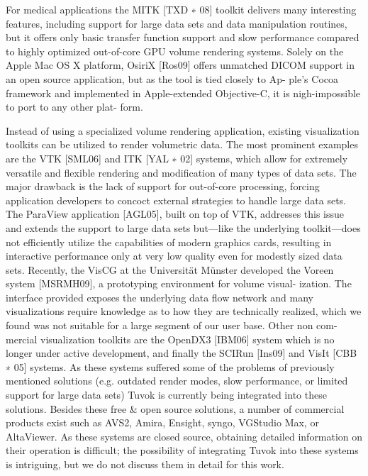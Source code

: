 For medical applications the MITK [TXD ∗ 08] toolkit 
delivers many interesting features, including support for large
data sets and data manipulation routines, but it offers only
basic transfer function support and slow performance compared
to highly optimized out-of-core GPU volume rendering
systems. Solely on the Apple Mac OS X platform,
OsiriX [Ros09] offers unmatched DICOM support in an
open source application, but as the tool is tied closely to Ap-
ple's Cocoa framework and implemented in Apple-extended
Objective-C, it is nigh-impossible to port to any other plat-
form.

Instead of using a specialized volume rendering application,
existing visualization toolkits can be utilized to render
volumetric data. The most prominent examples are the
VTK [SML06] and ITK [YAL ∗ 02] systems, which allow
for extremely versatile and flexible rendering and modification
of many types of data sets. The major drawback is
the lack of support for out-of-core processing, forcing
application developers to concoct external strategies to handle
large data sets. The ParaView application [AGL05], built on
top of VTK, addresses this issue and extends the support to
large data sets but---like the underlying toolkit---does not
efficiently utilize the capabilities of modern graphics cards,
resulting in interactive performance only at very low quality
even for modestly sized data sets. Recently, the VisCG
at the Universit\"at M\"unster developed the Voreen system
[MSRMH09], a prototyping environment for volume visual-
ization. The interface provided exposes the underlying data
flow network and many visualizations require knowledge as
to how they are technically realized, which we found was not
suitable for a large segment of our user base. Other non com-
mercial visualization toolkits are the OpenDX3 [IBM06]
system which is no longer under active development, and
finally the SCIRun [Ins09] and VisIt [CBB ∗ 05] systems. As
these systems suffered some of the problems of previously
mentioned solutions (e.g. outdated render modes, slow
performance, or limited support for large data sets) Tuvok is
currently being integrated into these solutions. Besides these
free \& open source solutions, a number of commercial products
exist such as AVS2, Amira, Ensight, syngo, VGStudio
Max, or AltaViewer. As these systems are closed source,
obtaining detailed information on their operation is difficult;
the possibility of integrating Tuvok into these systems is
intriguing, but we do not discuss them in detail for this work.

